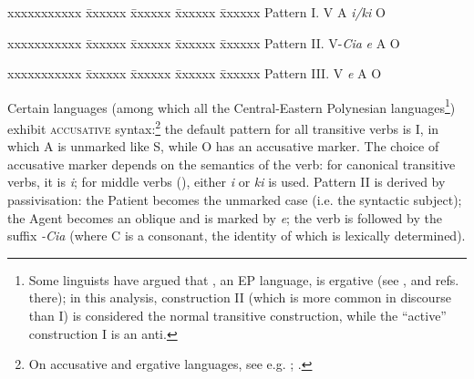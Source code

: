 \ea\label{ex:8.1a}
\begin{tabbing}
xxxxxxxxxxx \= xxxxxx \= xxxxxx \=  xxxxxx \= xxxxxx \kill
Pattern I. \>  V \>  A \>  \textit{i/ki} O
\end{tabbing}
\z

\ea\label{ex:8.1b}
\begin{tabbing}
xxxxxxxxxxx \= xxxxxx \= xxxxxx \=  xxxxxx \= xxxxxx \kill
Pattern II. \> V-\textit{Cia} \>  \textit{e} A \>  O  
\end{tabbing}
\z

\ea\label{ex:8.1c}
\begin{tabbing}
xxxxxxxxxxx \= xxxxxx \= xxxxxx \=  xxxxxx \= xxxxxx \kill
Pattern III.\>  V \>  \textit{e} A  \> O
\end{tabbing}
\z

Certain languages (among which all the Central-Eastern Polynesian languages\footnote{\label{fn:383}Some linguists have argued that , an EP language, is ergative (see \citealt[25]{Harlow2007Maori}, \citealt[26–36]{Pucilowsky2006} and refs. there); in this analysis, construction II (which is more common in  discourse than I) is considered the normal transitive construction, while the “active” construction I is an anti.}) exhibit \textsc{accusative} syntax:\footnote{\label{fn:384}On accusative and ergative languages, see e.g. \citet{Comrie1978}; \citet{Dixon1994}.} the default pattern for all transitive verbs is I, in which A is unmarked like S, while O has an accusative marker. The choice of accusative marker depends on the semantics of the verb: for canonical transitive verbs, it is \textit{i}; for middle verbs (), either \textit{i} or \textit{ki} is used. Pattern II is derived by passivisation: the Patient becomes the unmarked case (i.e. the syntactic subject); the Agent becomes an oblique and is marked by  \textit{e}; the verb is followed by the  suffix \textit{-Cia} (where C is a consonant, the identity of which is lexically determined).

